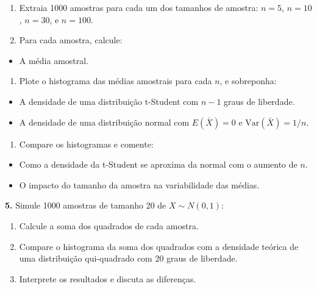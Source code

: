 \documentclass[
]{book}
\providecommand{\tightlist}{%
  \setlength{\itemsep}{0pt}\setlength{\parskip}{0pt}}
\begin{document}
\begin{enumerate}
\def\labelenumi{(\alph{enumi})}
\item
  Extraia 1000 amostras para cada um dos tamanhos de amostra: \(n=5\), \(n = 10\), \(n = 30\), e \(n = 100\).
\item
  Para cada amostra, calcule:
\end{enumerate}

\begin{itemize}
\tightlist
\item
  A média amostral.
\end{itemize}

\begin{enumerate}
\def\labelenumi{(\alph{enumi})}
\setcounter{enumi}{2}
\tightlist
\item
  Plote o histograma das médias amostrais para cada \(n\), e sobreponha:
\end{enumerate}

\begin{itemize}
\item
  A densidade de uma distribuição t-Student com \(n - 1\) graus de liberdade.
\item
  A densidade de uma distribuição normal com \(E(\bar{X}) = 0\) e \(\text{Var}(\bar{X}) = 1/n\).
\end{itemize}

\begin{enumerate}
\def\labelenumi{(\alph{enumi})}
\setcounter{enumi}{3}
\tightlist
\item
  Compare os histogramas e comente:
\end{enumerate}

\begin{itemize}
\item
  Como a densidade da t-Student se aproxima da normal com o aumento de \(n\).
\item
  O impacto do tamanho da amostra na variabilidade das médias.
\end{itemize}

\textbf{5.} Simule 1000 amostras de tamanho 20 de \(X \sim N(0, 1)\):

\begin{enumerate}
\def\labelenumi{(\alph{enumi})}
\item
  Calcule a soma dos quadrados de cada amostra.
\item
  Compare o histograma da soma dos quadrados com a densidade teórica de uma distribuição qui-quadrado com 20 graus de liberdade.
\item
  Interprete os resultados e discuta as diferenças.
\end{enumerate}
\end{document}
